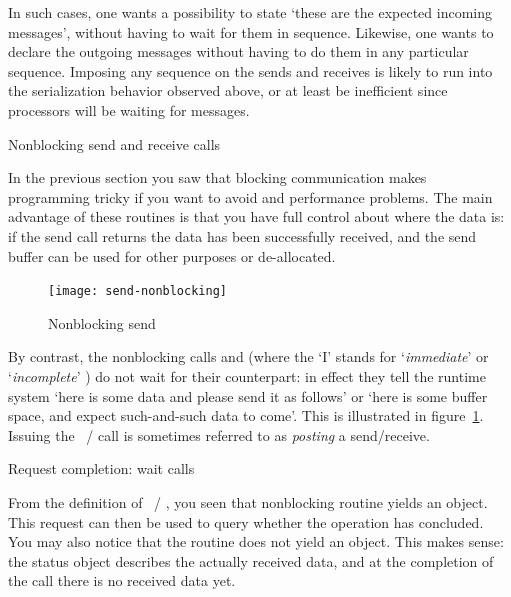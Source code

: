 In such cases, one wants a possibility to state `these are the expected incoming
messages', without having to wait for them in sequence. Likewise, one wants to declare
the outgoing messages without having to do them in any particular sequence.
Imposing any sequence on the sends and receives is likely to run into the serialization
behavior observed above, or at least be inefficient since processors will be
waiting for messages.

 {Nonblocking send and receive calls}
\label{sec:nonblocking}

In the previous section you saw that blocking communication makes
programming tricky if you want to avoid  and performance
problems. The main advantage of these routines is that you have full
control about where the data is: if the send call returns
the data has been successfully received, and the send buffer can be used for
other purposes or de-allocated.  

\begin{figure}[ht]
  \texttt{[image: send-nonblocking]}
  \caption{Nonblocking send}
  \label{fig:send-nonblocking}
\end{figure}

By contrast, the nonblocking calls
 and 
(where the `I' stands for
`\emph{immediate}'
or
`\emph{incomplete}'
)
do not wait for their counterpart: in effect
they tell the runtime system `here is some data and please send it as
follows' or `here is some buffer space, and expect such-and-such data
to come'.  This is illustrated in figure~\ref{fig:send-nonblocking}.
%
%
Issuing the ~/ 
call is sometimes referred to as
\emph{posting}
a send/receive.

 {Request completion: wait calls}

From the definition of ~/
, you seen that nonblocking routine yields
an  object. This request can then be used to
query whether the operation has concluded. You may also notice that
the  routine does not yield an
 object.  This makes sense: the status object
describes the actually received data, and at the completion of the
 call there is no received data yet.

